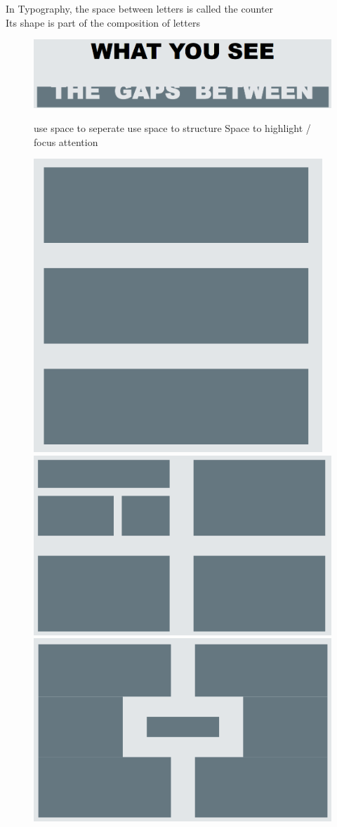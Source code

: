 \documentclass[]{project_plan}
\begin{document}
In Typography, the space between letters is called the counter\\
Its shape is part of the composition of letters

\begin{figure}[ht!]
  \includegraphics[width=40em]{the_counter.png}
\end{figure}

\newpage

\begin{figure}
  \centering
  \begin{minipage}{.5\textwidth}

    use space to seperate
    \vskip5cm
    use space to structure
    \vskip5cm
    Space to highlight / focus attention

  \end{minipage}%
  \begin{minipage}{.5\textwidth}

    \includegraphics[width=.4\linewidth]{graphic_design_space_to_seperate.png}
    \vskip3cm
    \includegraphics[width=.4\linewidth]{graphic_design_space_to_structure.png}
    \vskip4cm
    \includegraphics[width=.4\linewidth]{graphic_design_space_to_highlight.png}

  \end{minipage}
\end{figure}
\end{document}
